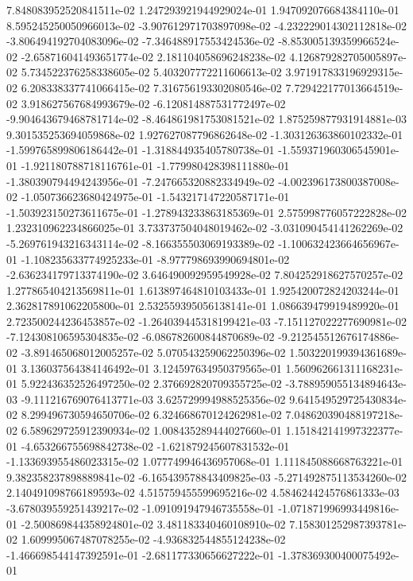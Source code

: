 7.848083952520841511e-02
1.247293921944929024e-01
1.947092076684384110e-01
8.595245250050966013e-02
-3.907612971703897098e-02
-4.232229014302112818e-02
-3.806494192704083096e-02
-7.346488917553424536e-02
-8.853005139359966524e-02
-2.658716041493651774e-02
2.181104058696248238e-02
4.126879282705005897e-02
5.734522376258338605e-02
5.403207772211606613e-02
3.971917833196929315e-02
6.208338337741066415e-02
7.316756193302080546e-02
7.729422177013664519e-02
3.918627567684993679e-02
-6.120814887531772497e-02
-9.904643679468781714e-02
-8.464861981753081521e-02
1.875259877931914881e-03
9.301535253694059868e-02
1.927627087796862648e-02
-1.303126363860102332e-01
-1.599765899806186442e-01
-1.318844935405780738e-01
-1.559371960306545901e-01
-1.921180788718116761e-01
-1.779980428398111880e-01
-1.380390794494243956e-01
-7.247665320882334949e-02
-4.002396173800387008e-02
-1.050736623680424975e-01
-1.543217147220587171e-01
-1.503923150273611675e-01
-1.278943233863185369e-01
2.575998776057222828e-02
1.232310962234866025e-01
3.733737504048019462e-02
-3.031090454141262269e-02
-5.269761943216343114e-02
-8.166355503069193389e-02
-1.100632423664656967e-01
-1.108235633774925233e-01
-8.977798693990694801e-02
-2.636234179713374190e-02
3.646490092959549928e-02
7.804252918627570257e-02
1.277865404213569811e-01
1.613897464810103433e-01
1.925420072824203244e-01
2.362817891062205800e-01
2.532559395056138141e-01
1.086639479919489920e-01
2.723500244236453857e-02
-1.264039445318199421e-03
-7.151127022277690981e-02
-7.124308106595304835e-02
-6.086782600844870689e-02
-9.212545512676174886e-02
-3.891465068012005257e-02
5.070543259062250396e-02
1.503220199394361689e-01
3.136037564384146492e-01
3.124597634950379565e-01
1.560962661311168231e-01
5.922436352526497250e-02
2.376692820709355725e-02
-3.788959055134894643e-03
-9.111216769076413771e-03
3.625729994988525356e-02
9.641549529725430834e-02
8.299496730594650706e-02
6.324668670124262981e-02
7.048620390488197218e-02
6.589629725912390934e-02
1.008435289444027660e-01
1.151842141997322377e-01
-4.653266755698842738e-02
-1.621879245607831532e-01
-1.133693955486023315e-02
1.077749946436957068e-01
1.111845088668763221e-01
9.382358237898889841e-02
-6.165439578843409825e-03
-5.271492875113534260e-02
2.140491098766189593e-02
4.515759455599695216e-02
4.584624424576861333e-03
-3.678039559251439217e-02
-1.091091947946735558e-01
-1.071871996993449816e-01
-2.500869844358924801e-02
3.481183340460108910e-02
7.158301252987393781e-02
1.609995067487078255e-02
-4.936832544855124238e-02
-1.466698544147392591e-01
-2.681177330656627222e-01
-1.378369300400075492e-01
